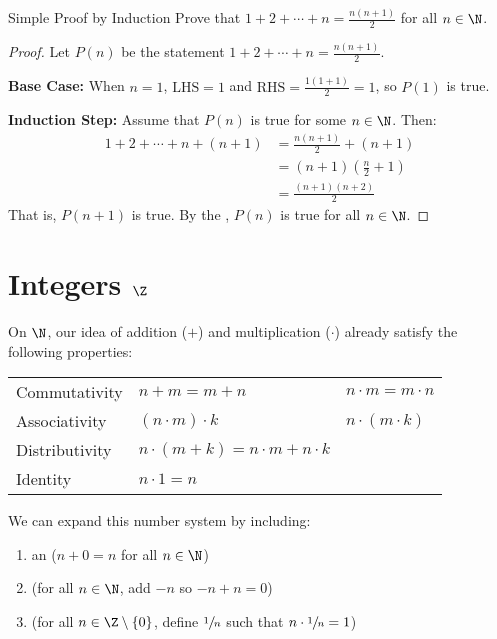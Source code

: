 \documentclass[12pt]{report}
\begin{document}
\begin{exbox}{Simple Proof by Induction}{}
    Prove that $1+2+\cdots + n = \frac{n(n+1)}{2}$ for all $n \in \N$.
    \tcblower
    \begin{proof}
        Let $P(n)$ be the statement $1 + 2 + \cdots + n = \frac{n(n+1)}{2}$.

        \textbf{Base Case:} When $n=1$, $\text{LHS} = 1$ and $\text{RHS} = \frac{1(1+1)}{2} = 1$, so $P(1)$ is true.

        \textbf{Induction Step:} Assume that $P(n)$ is true for some $n \in \N$. Then:
        \begin{align*}
            1 + 2 + \cdots + n + (n+1)
            &= \frac{n(n+1)}{2} + (n+1) \\
            &= (n+1) \left( \frac{n}{2} + 1 \right) \\
            &= \frac{(n+1)(n+2)}{2}
        \end{align*}
        That is, $P(n+1)$ is true. By the , $P(n)$ is true for all $n \in \N$.
    \end{proof}
\end{exbox}

\section{Integers $\Z$}
On $\N$, our idea of addition ($+$) and multiplication ($\cdot$) already satisfy the following properties:

\begin{tabular}{l l l}
    Commutativity & $n+m = m+n$ & $n \cdot m = m \cdot n$ \\
    Associativity & $(n \cdot m) \cdot k$ & $n \cdot (m \cdot k)$ \\
    Distributivity & $n \cdot (m + k) = n \cdot m + n \cdot k$ \\
    Identity & $n \cdot 1 = n$
\end{tabular}

We can expand this number system by including:
\begin{enumerate}
    \item an  ($n+0 = n$ for all $n \in \N$)
    \item {} (for all $n \in \N$, add $-n$ so $-n + n = 0$)
    \item {} (for all $n \in \Z \setminus \{0\}$, define $\sfrac{1}{n}$ such that $n \cdot \sfrac{1}{n} = 1$)
\end{enumerate}
\end{document}
